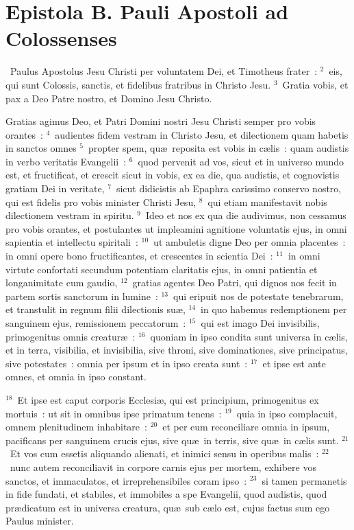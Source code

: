 {\centering \section*{Epistola B. Pauli Apostoli ad Colossenses}}\thispagestyle{empty}

~\lettrine[lines=10,image=true,loversize=0.05,lraise=-0.03]{P}{}aulus Apostolus Jesu Christi per voluntatem Dei, et Timotheus frater~:
${}^{2}$~eis, qui sunt Colossis, sanctis, et fidelibus fratribus in Christo Jesu.
${}^{3}$~Gratia vobis, et pax a Deo Patre nostro, et Domino Jesu Christo.

 Gratias agimus Deo, et Patri Domini nostri Jesu Christi semper pro vobis orantes~:
${}^{4}$~audientes fidem vestram in Christo Jesu, et dilectionem quam habetis in sanctos omnes
${}^{5}$~propter spem, qu\ae\ reposita est vobis in c\ae lis~: quam audistis in verbo veritatis Evangelii~:
${}^{6}$~quod pervenit ad vos, sicut et in universo mundo est, et fructificat, et crescit sicut in vobis, ex ea die, qua audistis, et cognovistis gratiam Dei in veritate,
${}^{7}$~sicut didicistis ab Epaphra carissimo conservo nostro, qui est fidelis pro vobis minister Christi Jesu,
${}^{8}$~qui etiam manifestavit nobis dilectionem vestram in spiritu.
${}^{9}$~Ideo et nos ex qua die audivimus, non cessamus pro vobis orantes, et postulantes ut impleamini agnitione voluntatis ejus, in omni sapientia et intellectu spiritali~:
${}^{10}$~ut ambuletis digne Deo per omnia placentes~: in omni opere bono fructificantes, et crescentes in scientia Dei~:
${}^{11}$~in omni virtute confortati secundum potentiam claritatis ejus, in omni patientia et longanimitate cum gaudio,
${}^{12}$~gratias agentes Deo Patri, qui dignos nos fecit in partem sortis sanctorum in lumine~:
${}^{13}$~qui eripuit nos de potestate tenebrarum, et transtulit in regnum filii dilectionis su\ae ,
${}^{14}$~in quo habemus redemptionem per sanguinem ejus, remissionem peccatorum~:
${}^{15}$~qui est imago Dei invisibilis, primogenitus omnis creatur\ae~:
${}^{16}$~quoniam in ipso condita sunt universa in c\ae lis, et in terra, visibilia, et invisibilia, sive throni, sive dominationes, sive principatus, sive potestates~: omnia per ipsum et in ipso creata sunt~:
${}^{17}$~et ipse est ante omnes, et omnia in ipso constant.


${}^{18}$~Et ipse est caput corporis Ecclesi\ae , qui est principium, primogenitus ex mortuis~: ut sit in omnibus ipse primatum tenens~:
${}^{19}$~quia in ipso complacuit, omnem plenitudinem inhabitare~:
${}^{20}$~et per eum reconciliare omnia in ipsum, pacificans per sanguinem crucis ejus, sive qu\ae\ in terris, sive qu\ae\ in c\ae lis sunt.
${}^{21}$~Et vos cum essetis aliquando alienati, et inimici sensu in operibus malis~:
${}^{22}$~nunc autem reconciliavit in corpore carnis ejus per mortem, exhibere vos sanctos, et immaculatos, et irreprehensibiles coram ipso~:
${}^{23}$~si tamen permanetis in fide fundati, et stabiles, et immobiles a spe Evangelii, quod audistis, quod pr\ae dicatum est in universa creatura, qu\ae\ sub c\ae lo est, cujus factus sum ego Paulus minister.


